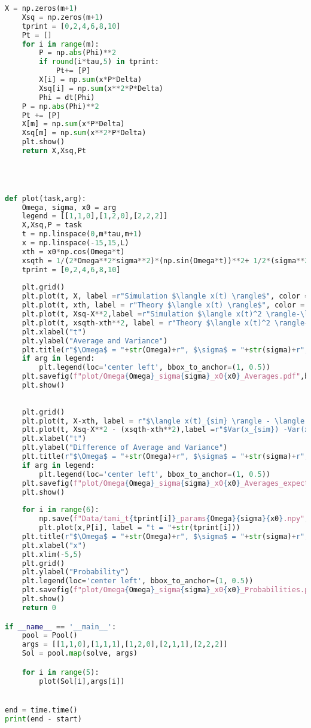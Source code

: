 \begin{lstlisting}[language=Python]
    X = np.zeros(m+1)
    Xsq = np.zeros(m+1)
    tprint = [0,2,4,6,8,10]
    Pt = []
    for i in range(m):
        P = np.abs(Phi)**2
        if round(i*tau,5) in tprint:
            Pt+= [P]
        X[i] = np.sum(x*P*Delta)
        Xsq[i] = np.sum(x**2*P*Delta)
        Phi = dt(Phi)
    P = np.abs(Phi)**2
    Pt += [P]
    X[m] = np.sum(x*P*Delta)
    Xsq[m] = np.sum(x**2*P*Delta)
    plt.show()
    return X,Xsq,Pt


    

def plot(task,arg):
    Omega, sigma, x0 = arg
    legend = [[1,1,0],[1,2,0],[2,2,2]]
    X,Xsq,P = task
    t = np.linspace(0,m*tau,m+1)
    x = np.linspace(-15,15,L)
    xth = x0*np.cos(Omega*t)
    xsqth = 1/(2*Omega**2*sigma**2)*(np.sin(Omega*t))**2+ 1/2*(sigma**2+2*x0**2)*(np.cos(Omega*t))**2
    tprint = [0,2,4,6,8,10]
    
    plt.grid()
    plt.plot(t, X, label =r"Simulation $\langle x(t) \rangle$", color ="tab:blue")
    plt.plot(t, xth, label = r"Theory $\langle x(t) \rangle$", color = "tab:blue", ls = "--",alpha = 0.5)
    plt.plot(t, Xsq-X**2,label =r"Simulation $\langle x(t)^2 \rangle-\langle x(t) \rangle^2$", color ="tab:orange")
    plt.plot(t, xsqth-xth**2, label = r"Theory $\langle x(t)^2 \rangle-\langle x(t) \rangle^2$",alpha = 0.5, color = "tab:orange",ls = "--")
    plt.xlabel("t")
    plt.ylabel("Average and Variance")
    plt.title(r"$\Omega$ = "+str(Omega)+r", $\sigma$ = "+str(sigma)+r", $x_0$ = "+str(x0))
    if arg in legend:
        plt.legend(loc='center left', bbox_to_anchor=(1, 0.5))
    plt.savefig(f"plot/Omega{Omega}_sigma{sigma}_x0{x0}_Averages.pdf",bbox_inches='tight')
    plt.show()
    
    
    plt.grid()
    plt.plot(t, X-xth, label = r"$\langle x(t)_{sim} \rangle - \langle x(t)_{theo} \rangle$", color = "tab:blue")
    plt.plot(t, Xsq-X**2 - (xsqth-xth**2),label =r"$Var(x_{sim}) -Var(x_{theo})$", color ="tab:orange")
    plt.xlabel("t")
    plt.ylabel("Difference of Average and Variance")
    plt.title(r"$\Omega$ = "+str(Omega)+r", $\sigma$ = "+str(sigma)+r", $x_0$ = "+str(x0))
    if arg in legend:
        plt.legend(loc='center left', bbox_to_anchor=(1, 0.5))
    plt.savefig(f"plot/Omega{Omega}_sigma{sigma}_x0{x0}_Averages_expect.pdf",bbox_inches='tight')
    plt.show()
    
    for i in range(6):
        np.save(f"Data/tami_t{tprint[i]}_params{Omega}{sigma}{x0}.npy", P[i])
        plt.plot(x,P[i], label = "t = "+str(tprint[i]))
    plt.title(r"$\Omega$ = "+str(Omega)+r", $\sigma$ = "+str(sigma)+r", $x_0$ = "+str(x0))
    plt.xlabel("x")
    plt.xlim(-5,5)
    plt.grid()
    plt.ylabel("Probability")
    plt.legend(loc='center left', bbox_to_anchor=(1, 0.5))
    plt.savefig(f"plot/Omega{Omega}_sigma{sigma}_x0{x0}_Probabilities.pdf",bbox_inches='tight')
    plt.show()
    return 0

if __name__ == '__main__':
    pool = Pool()
    args = [[1,1,0],[1,1,1],[1,2,0],[2,1,1],[2,2,2]]
    Sol = pool.map(solve, args)

    for i in range(5):
        plot(Sol[i],args[i])


end = time.time()
print(end - start)
\end{lstlisting}
